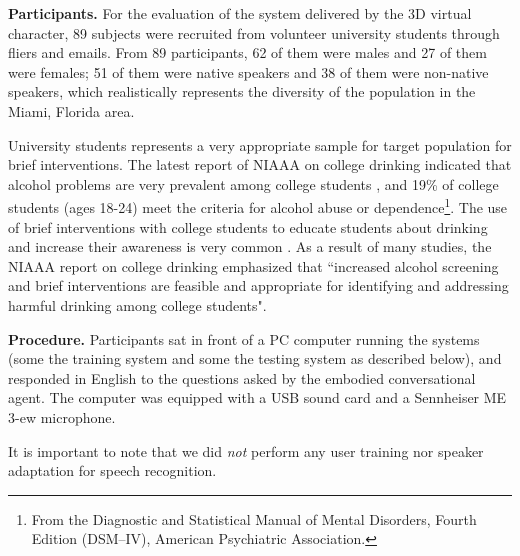 \documentclass[letterpaper]{article}
\begin{document}
{\bf Participants.} For the evaluation of the system delivered by the 3D virtual character, 89 subjects were recruited from volunteer university students through fliers and emails.  From 89 participants, 62 of them were males and 27 of them were females; 51 of them were native speakers and 38 of them were non-native speakers,   which realistically represents the diversity of the population in the Miami, Florida area.

University students represents a very appropriate sample for target population for brief interventions. The latest report of NIAAA on college drinking indicated that alcohol problems are very prevalent among college students \cite{NIAAA2007colleges}, and 19\% of college students (ages 18-24) meet the criteria for alcohol abuse or dependence\footnote{From the Diagnostic and Statistical Manual of Mental Disorders, Fourth Edition (DSM–IV), American Psychiatric Association.}. The use of brief interventions with college students to educate students about drinking and  increase their awareness is very common \cite{NIAAA2007colleges}. As a result of many studies, the NIAAA report on college drinking emphasized that ``increased alcohol screening and brief interventions are feasible  and appropriate for identifying and addressing harmful drinking among college students". 

{\bf Procedure.} Participants sat in front of a PC computer running the systems (some the training system and some the testing system as described below), and responded in English to the questions asked by the embodied conversational agent.  The computer was equipped with a USB sound card and a Sennheiser ME 3-ew microphone.

It is important to note that we did {\em not} perform any user training nor speaker adaptation for speech recognition. 
\end{document}

